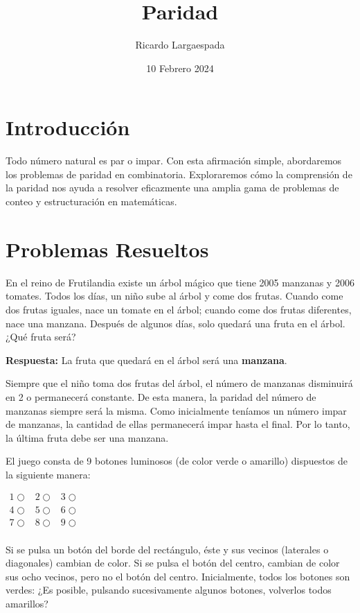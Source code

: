 \documentclass[11pt]{scrartcl}
\begin{document}
\title{Paridad}
\author{Ricardo Largaespada}
\date{10 Febrero 2024}

\maketitle

\section{Introducción}

Todo número natural es par o impar. Con esta afirmación simple, abordaremos los problemas de paridad en combinatoria. Exploraremos cómo la comprensión de la paridad nos ayuda a resolver eficazmente una amplia gama de problemas de conteo y estructuración en matemáticas.

\section{Problemas Resueltos}
\begin{example}
En el reino de Frutilandia existe un árbol mágico que tiene 2005 manzanas y 2006 tomates. Todos los días, un niño sube al árbol y come dos frutas. Cuando come dos frutas iguales, nace un tomate en el árbol; cuando come dos frutas diferentes, nace una manzana. Después de algunos días, solo quedará una fruta en el árbol. ¿Qué fruta será?
\end{example}

\textbf{Respuesta:} La fruta que quedará en el árbol será una \textbf{manzana}.

Siempre que el niño toma dos frutas del árbol, el número de manzanas disminuirá en 2 o permanecerá constante. De esta manera, la paridad del número de manzanas siempre será la misma. Como inicialmente teníamos un número impar de manzanas, la cantidad de ellas permanecerá impar hasta el final. Por lo tanto, la última fruta debe ser una manzana.

\begin{example}
El juego consta de 9 botones luminosos (de color verde o amarillo) dispuestos de la siguiente manera:

\begin{center}
\(\begin{array}{ccc}
    1\bigcirc & 2\bigcirc & 3\bigcirc\\
    4\bigcirc & 5\bigcirc & 6\bigcirc\\
    7\bigcirc & 8\bigcirc & 9\bigcirc\\
\end{array}\)
\end{center}

Si se pulsa un botón del borde del rectángulo, éste y sus vecinos (laterales o diagonales) cambian de color. Si se pulsa el botón del centro, cambian de color sus ocho vecinos, pero no el botón del centro. Inicialmente, todos los botones son verdes: ¿Es posible, pulsando sucesivamente algunos botones, volverlos todos amarillos?
\end{example}
\end{document}
